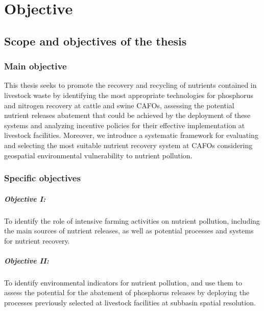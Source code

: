 \chapter{Objective}\label{ch:objectives}

\section{Scope and objectives of the thesis}
\subsection{Main objective}
This thesis seeks to promote the recovery and recycling of nutrients contained in livestock waste by identifying the most appropriate technologies for phosphorus and nitrogen recovery at cattle and swine CAFOs, assessing the potential nutrient releases abatement that could be achieved by the deployment of these systems and analyzing incentive policies for their effective implementation at livestock facilities. Moreover, we introduce a systematic framework for evaluating and selecting the most suitable nutrient recovery system at CAFOs considering geospatial environmental vulnerability to nutrient pollution. 

\subsection{Specific objectives}
\paragraph{Objective I:} To
identify the role of intensive farming activities on nutrient pollution, including the main sources of nutrient releases, as well as potential processes and systems for nutrient recovery.
\paragraph{Objective II:} To identify environmental indicators for nutrient pollution, and use  them to  assess the potential for the abatement of phosphorus releases by deploying the processes previously selected at livestock facilities at subbasin spatial resolution.
